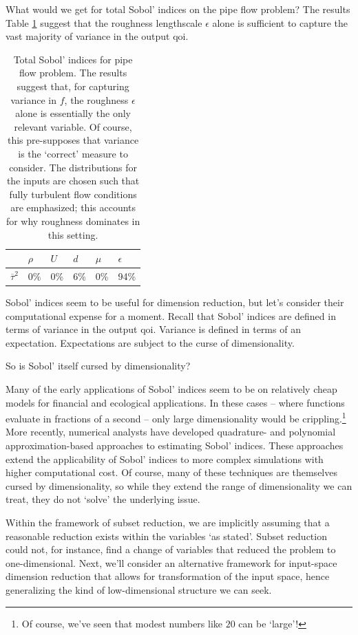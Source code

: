 \documentclass{article}
\begin{document}
What would we get for total Sobol' indices on the pipe flow problem? The results
Table \ref{tab:pipe-sobol} suggest that the roughness lengthscale $\epsilon$
alone is sufficient to capture the vast majority of variance in the output qoi.

\begin{table}[!ht]
  \centering
  \begin{tabular}{@{}llllll@{}}
   & $\rho$ & $U$ & $d$ & $\mu$ & $\epsilon$\\
  \hline
  $\overline{\tau}^2$ & 0\% & 0\% & 6\% & 0\% & 94\% \\
  \end{tabular}
  \caption{Total Sobol' indices for pipe flow problem. The results suggest that,
    for capturing variance in $f$, the roughness $\epsilon$ alone is essentially
    the only relevant variable. Of course, this pre-supposes that variance is
    the `correct' measure to consider. The distributions for the inputs are
    chosen such that fully turbulent flow conditions are emphasized; this
    accounts for why roughness dominates in this setting.}
  \label{tab:pipe-sobol}
\end{table}

Sobol' indices seem to be useful for dimension reduction, but let's consider
their computational expense for a moment. Recall that Sobol' indices are defined
in terms of variance in the output qoi. Variance is defined in terms of an
expectation. Expectations are subject to the curse of dimensionality.

\bigskip
So is Sobol' itself cursed by dimensionality?

\bigskip
Many of the early applications of Sobol' indices seem to be on relatively cheap
models for financial and ecological applications.\cite{saltelli2004sensitivity}
In these cases -- where functions evaluate in fractions of a second -- only
large dimensionality would be crippling.\footnote{Of course, we've seen that
  modest numbers like $20$ can be `large'!} More recently, numerical analysts
have developed quadrature- and polynomial approximation-based approaches to
estimating Sobol' indices.\cite{sudret2008global} These approaches extend the
applicability of Sobol' indices to more complex simulations with higher
computational cost. Of course, many of these techniques are themselves cursed by
dimensionality, so while they extend the range of dimensionality we can treat,
they do not `solve' the underlying issue.

Within the framework of subset reduction, we are implicitly assuming that a
reasonable reduction exists within the variables `as stated'. Subset reduction
could not, for instance, find a change of variables that reduced the problem to
one-dimensional. Next, we'll consider an alternative framework for input-space
dimension reduction that allows for transformation of the input space, hence
generalizing the kind of low-dimensional structure we can seek.
\end{document}
